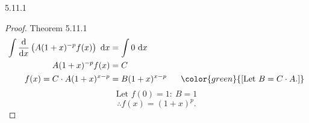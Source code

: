 \documentclass[12pt, a4paper]{article}
\def\d{{\mathrm{d}}}
\begin{document}
\begin{enumerate}
\begin{itemize}
\begin{theorem}{5.11.1}{}
\begin{proof}{Theorem 5.11.1}{}
$$\begin{aligned}
                    \int \frac{\d}{\d x}\left(A(1+x)^{-p}f(x)\right)\ \d x&=\int 0\ \d x\\
                    A(1+x)^{-p}f(x)&=C\\
                    f(x)=C\cdot A(1+x)^{x-p}&=B(1+x)^{x-p}\ \ \ \ \ {\color{green}{[\text{Let }B=C\cdot A.]}}
                \end{aligned}$$
                $$\text{Let }f(0)=1:\ B=1$$
                $$\therefore f(x)=(1+x)^p.$$
            \end{proof}
        \end{theorem}
    \end{itemize}
\end{enumerate}
\end{document}
